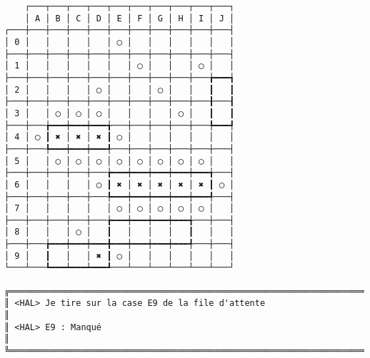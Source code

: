 {\scriptsize
\begin{verbatim}
    ┌───┬───┬───┬───┬───┬───┬───┬───┬───┬───┐
    │ A │ B │ C │ D │ E │ F │ G │ H │ I │ J │
┌───┼───┼───┼───┼───┼───┼───┼───┼───┼───┼───┤
│ 0 │   │   │   │   │ ◯ │   │   │   │   │   │
├───┼───┼───┼───┼───┼───┼───┼───┼───┼───┼───┤
│ 1 │   │   │   │   │   │ ◯ │   │   │ ◯ │   │
├───┼───┼───┼───┼───┼───┼───┼───┼───┼───╆━━━┪
│ 2 │   │   │   │ ◯ │   │   │ ◯ │   │   ┃   ┃
├───┼───┼───┼───┼───┼───┼───┼───┼───┼───╂───┨
│ 3 │   │ ◯ │ ◯ │ ◯ │   │   │   │ ◯ │   ┃   ┃
├───┼───╆━━━┿━━━┿━━━╅───┼───┼───┼───┼───╄━━━┩
│ 4 │ ◯ ┃ ✖ │ ✖ │ ✖ ┃ ◯ │   │   │   │   │   │
├───┼───╄━━━┿━━━┿━━━╃───┼───┼───┼───┼───┼───┤
│ 5 │   │ ◯ │ ◯ │ ◯ │ ◯ │ ◯ │ ◯ │ ◯ │ ◯ │   │
├───┼───┼───┼───┼───╆━━━┿━━━┿━━━┿━━━┿━━━╅───┤
│ 6 │   │   │   │ ◯ ┃ ✖ │ ✖ │ ✖ │ ✖ │ ✖ ┃ ◯ │
├───┼───┼───┼───┼───╄━━━┿━━━┿━━━┿━━━┿━━━╃───┤
│ 7 │   │   │   │   │ ◯ │ ◯ │ ◯ │ ◯ │ ◯ │   │
├───┼───┼───┼───┼───╆━━━┿━━━┿━━━┿━━━╅───┼───┤
│ 8 │   │   │ ◯ │   ┃   │   │   │   ┃   │   │
├───┼───╆━━━┿━━━┿━━━╋━━━┿━━━┿━━━┿━━━╃───┼───┤
│ 9 │   ┃   │   │ ✖ ┃ ◯ │   │   │   │   │   │
└───┴───┺━━━┷━━━┷━━━┹───┴───┴───┴───┴───┴───┘

╔══════════════════════════════════════════════════════════════════════════════════════════════════╗
║ <HAL> Je tire sur la case E9 de la file d'attente                                                ║
║ <HAL> E9 : Manqué                                                                                ║
╚══════════════════════════════════════════════════════════════════════════════════════════════════╝
\end{verbatim}}
\newpage

